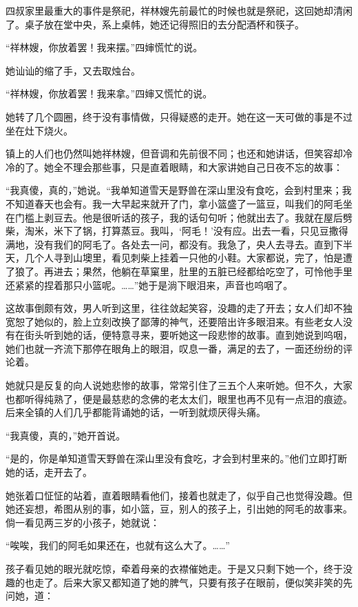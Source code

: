 \par 四叔家里最重大的事件是祭祀，祥林嫂先前最忙的时候也就是祭祀，这回她却清闲了。桌子放在堂中央，系上桌帏，她还记得照旧的去分配酒杯和筷子。
\par “祥林嫂，你放着罢！我来摆。”四婶慌忙的说。
\par 她讪讪的缩了手，又去取烛台。
\par “祥林嫂，你放着罢！我来拿。”四婶又慌忙的说。
\par 她转了几个圆圈，终于没有事情做，只得疑惑的走开。她在这一天可做的事是不过坐在灶下烧火。
\par 镇上的人们也仍然叫她祥林嫂，但音调和先前很不同；也还和她讲话，但笑容却冷冷的了。她全不理会那些事，只是直着眼睛，和大家讲她自己日夜不忘的故事：
\par “我真傻，真的，”她说。“我单知道雪天是野兽在深山里没有食吃，会到村里来；我不知道春天也会有。我一大早起来就开了门，拿小篮盛了一篮豆，叫我们的阿毛坐在门槛上剥豆去。他是很听话的孩子，我的话句句听；他就出去了。我就在屋后劈柴，淘米，米下了锅，打算蒸豆。我叫，‘阿毛！’没有应。出去一看，只见豆撒得满地，没有我们的阿毛了。各处去一问，都没有。我急了，央人去寻去。直到下半天，几个人寻到山墺里，看见刺柴上挂着一只他的小鞋。大家都说，完了，怕是遭了狼了。再进去；果然，他躺在草窠里，肚里的五脏已经都给吃空了，可怜他手里还紧紧的捏着那只小篮呢。……”她于是淌下眼泪来，声音也呜咽了。
\par 这故事倒颇有效，男人听到这里，往往敛起笑容，没趣的走了开去；女人们却不独宽恕了她似的，脸上立刻改换了鄙薄的神气，还要陪出许多眼泪来。有些老女人没有在街头听到她的话，便特意寻来，要听她这一段悲惨的故事。直到她说到呜咽，她们也就一齐流下那停在眼角上的眼泪，叹息一番，满足的去了，一面还纷纷的评论着。
\par 她就只是反复的向人说她悲惨的故事，常常引住了三五个人来听她。但不久，大家也都听得纯熟了，便是最慈悲的念佛的老太太们，眼里也再不见有一点泪的痕迹。后来全镇的人们几乎都能背诵她的话，一听到就烦厌得头痛。
\par “我真傻，真的，”她开首说。
\par “是的，你是单知道雪天野兽在深山里没有食吃，才会到村里来的。”他们立即打断她的话，走开去了。
\par 她张着口怔怔的站着，直着眼睛看他们，接着也就走了，似乎自己也觉得没趣。但她还妄想，希图从别的事，如小篮，豆，别人的孩子上，引出她的阿毛的故事来。倘一看见两三岁的小孩子，她就说：
\par “唉唉，我们的阿毛如果还在，也就有这么大了。……”
\par 孩子看见她的眼光就吃惊，牵着母亲的衣襟催她走。于是又只剩下她一个，终于没趣的也走了。后来大家又都知道了她的脾气，只要有孩子在眼前，便似笑非笑的先问她，道：
